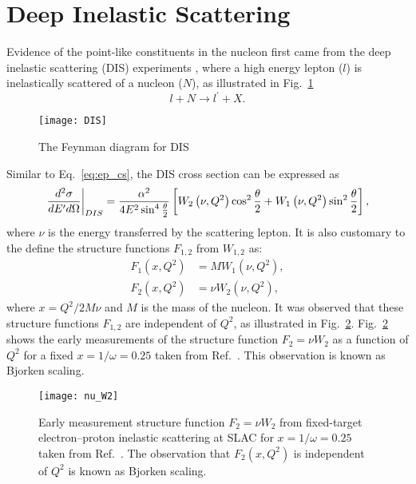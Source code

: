 \section {Deep Inelastic Scattering}
\label{sec:dis}
Evidence of the point-like constituents in the nucleon first came from the deep
inelastic scattering (DIS) experiments \cite{breidenbach1969}, where a high 
energy lepton ($l$) is inelastically scattered of a nucleon ($N$), as 
illustrated in Fig.\ \ref{fig:DIS}
\begin{equation}
	l + N \rightarrow l^\prime + X.
\end{equation}
\begin{figure}[htbp!]
    \centering
    \texttt{[image: DIS]}
    \caption{The Feynman diagram for DIS}
    \label{fig:DIS}
\end{figure}
Similar to Eq.\ \ref{eq:ep_cs}, the DIS cross section can be expressed as 
\begin{equation}
	\eval{\frac{d^2\sigma}{dE^\prime d\Omega}}_{DIS} = \frac{\alpha^2}{4E^2 \sin^4 
	\frac{\theta}{2}} \left[ W_2\left(\nu,Q^2\right)\cos^2
	\frac{\theta}{2} + W_1\left(\nu,Q^2\right)\sin^2 \frac{\theta}{2}
	\right],
	\label{eq:DIS_cs1}
\end{equation}
where $\nu$ is the energy transferred by the scattering lepton. It is also 
customary to the define the structure functions $F_{1,2}$ from $W_{1,2}$ as:
\begin{equation}
	\begin{split}
		F_1\left(x,Q^2\right) &= MW_1\left(\nu,Q^2\right),\\
		F_2\left(x,Q^2\right) &= \nu W_2\left(\nu,Q^2\right),
	\end{split}
\end{equation}
where $x=Q^2/2M\nu$ and $M$ is the mass of the nucleon. It was observed that 
these structure functions $F_{1,2}$ are independent of $Q^2$, as illustrated in
Fig.\ \ref{fig:w2}. Fig.\ \ref{fig:w2} shows the early measurements of the 
structure function $F_2=\nu W_2$ as a function of $Q^2$ for a fixed 
$x=1/\omega=0.25$ taken from Ref.\ \cite{friedman1972}. This observation is 
known as Bjorken scaling\cite{bjorken1969}.
\begin{figure}[htpb!]
	\centering
	\texttt{[image: nu\_W2]}
	\caption{Early measurement structure function $F_2=\nu W_2$ from 
	fixed-target electron–proton inelastic scattering at SLAC for 
	$x=1/\omega=0.25$ taken from Ref.\ \cite{friedman1972}. The observation 
	that $F_2(x,Q^2)$ is independent of $Q^2$ is known as Bjorken scaling. }
	\label{fig:w2}
\end{figure}

